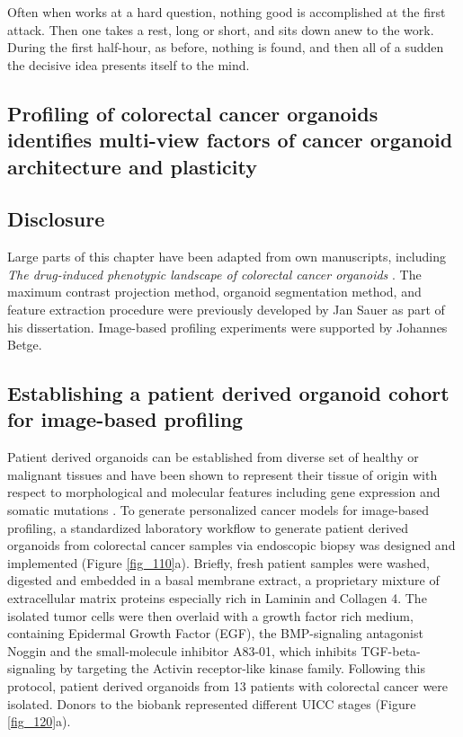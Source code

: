 \begin{savequote}[75mm]
Often when works at a hard question, nothing good is accomplished at the first attack. Then one takes a rest, long or short, and sits down anew to the work. During the first half-hour, as before, nothing is found, and then all of a sudden the decisive idea presents itself to the mind.
\end{savequote}

\begin{flushleft}
\chapter{Profiling of colorectal cancer organoids identifies multi-view factors of cancer organoid architecture and plasticity}


\section{Disclosure}
Large parts of this chapter have been adapted from own manuscripts, including \textit{The drug-induced phenotypic landscape of colorectal cancer organoids} \citep{Betge2022-kr}. The maximum contrast projection method, organoid segmentation method, and feature extraction procedure were previously developed by Jan Sauer as part of his dissertation. Image-based profiling experiments were supported by Johannes Betge. 

\section{Establishing a patient derived organoid cohort for image-based profiling}
Patient derived organoids can be established from diverse set of healthy or malignant tissues and have been shown to represent their tissue of origin with respect to morphological and molecular features including gene expression and somatic mutations \citep{Fujii2016-ax, Weeber2015-sn, Van_De_Wetering2015-ko, Sato2011-lh,  Broutier2017-wg}. To generate personalized cancer models for image-based profiling, a standardized laboratory workflow to generate patient derived organoids from colorectal cancer samples via endoscopic biopsy was designed and implemented (Figure \ref{fig_110}a). Briefly, fresh patient samples were washed, digested and embedded in a basal membrane extract, a proprietary mixture of extracellular matrix proteins especially rich in Laminin and Collagen 4. The isolated tumor cells were then overlaid with a growth factor rich medium, containing Epidermal Growth Factor (EGF), the BMP-signaling antagonist Noggin and the small-molecule inhibitor A83-01, which inhibits TGF-beta-signaling by targeting the Activin receptor-like kinase family. Following this protocol, patient derived organoids from 13 patients with colorectal cancer were isolated. Donors to the biobank represented different UICC stages (Figure \ref{fig_120}a). 


\end{flushleft}
